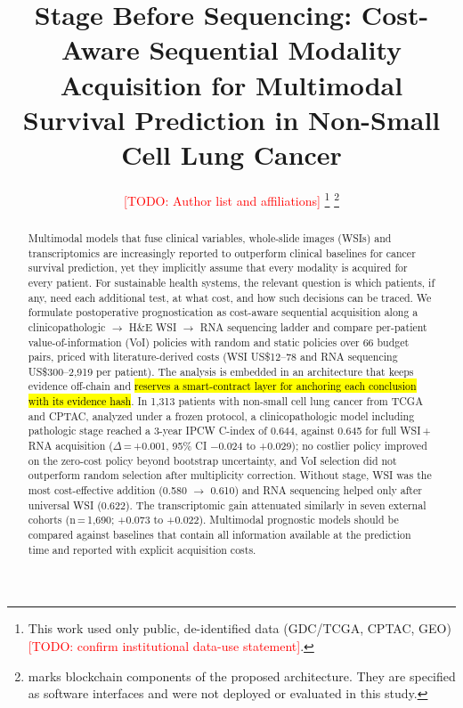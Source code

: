 \documentclass[journal,twoside,web]{IEEEtran}
\newif\ifchainhl \chainhltrue
\newcommand{\bc}[1]{\hl{#1}}
\newcommand{\bc}[1]{#1}
\newcommand{\todo}[1]{\textcolor{red}{[TODO: #1]}}
\begin{document}
\title{Stage Before Sequencing: Cost-Aware Sequential Modality Acquisition for Multimodal Survival Prediction in Non-Small Cell Lung Cancer}

\author{\todo{Author list and affiliations}%
\thanks{This work used only public, de-identified data (GDC/TCGA, CPTAC, GEO) \todo{confirm institutional data-use statement}.}%
\thanks{\ifchainhl{} marks blockchain components of the proposed architecture. They are specified as software interfaces and were not deployed or evaluated in this study.\fi}}

\maketitle

\begin{abstract}
Multimodal models that fuse clinical variables, whole-slide images (WSIs) and transcriptomics are increasingly reported to outperform clinical baselines for cancer survival prediction, yet they implicitly assume that every modality is acquired for every patient. For sustainable health systems, the relevant question is which patients, if any, need each additional test, at what cost, and how such decisions can be traced. We formulate postoperative prognostication as cost-aware sequential acquisition along a clinicopathologic $\rightarrow$ H\&E WSI $\rightarrow$ RNA sequencing ladder and compare per-patient value-of-information (VoI) policies with random and static policies over 66 budget pairs, priced with literature-derived costs (WSI US\$12--78 and RNA sequencing US\$300--2,919 per patient). The analysis is embedded in an architecture that keeps evidence off-chain and \bc{reserves a smart-contract layer for anchoring each conclusion with its evidence hash}. In 1,313 patients with non-small cell lung cancer from TCGA and CPTAC, analyzed under a frozen protocol, a clinicopathologic model including pathologic stage reached a 3-year IPCW C-index of 0.644, against 0.645 for full WSI\,+\,RNA acquisition ($\Delta$\,=\,+0.001, 95\% CI $-$0.024 to +0.029); no costlier policy improved on the zero-cost policy beyond bootstrap uncertainty, and VoI selection did not outperform random selection after multiplicity correction. Without stage, WSI was the most cost-effective addition (0.580 $\rightarrow$ 0.610) and RNA sequencing helped only after universal WSI (0.622). The transcriptomic gain attenuated similarly in seven external cohorts (n\,=\,1,690; +0.073 to +0.022). Multimodal prognostic models should be compared against baselines that contain all information available at the prediction time and reported with explicit acquisition costs.
\end{abstract}
\end{document}
